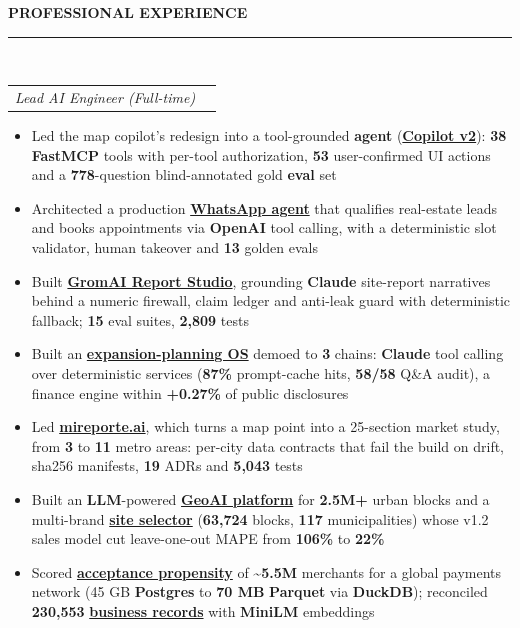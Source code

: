 \documentclass[10pt]{resume_gairo_peralta_openfont}
\makeatletter
\renewcommand{\section}[1]{%
  \vspace{3pt}%
  \raggedright{
    {\Large\bfseries\textcolor{sectioncolor}{\uppercase{#1}}}
  }\\[-0.6em]
  \rule{\textwidth}{0.5pt}\\[0.05em] %
}
\newenvironment{tightitemize}
{\begin{itemize}[leftmargin=1.2em,label={\textcolor{accentcolor}{$\bullet$}},itemsep=0.15em,partopsep=0pt,parsep=0pt,topsep=0pt]\raggedright}
{\end{itemize}}
\newcommand{\companytext}[1]{{\color{companycolor}\textbf{\textsc{#1}}}}
\newcommand{\roletext}[1]{{\color{rolecolor}\textit{#1}}}
\newcommand{\positionlocation}[3]{
  \begin{tabular*}{\textwidth}{@{}l@{\extracolsep{\fill}}r@{}}
    \roletext{#1} & \makebox[6.2cm][l]{#2 \hfill {\color{datecolor}\textbf{#3}}}
  \end{tabular*}
}
\newcommand{\highlight}[1]{{\textcolor{metriccolor}{\textbf{#1}}}}
\newcommand{\approxsym}{\textasciitilde}
\newcommand{\caselink}[2]{\href{https://gairoperalta.com/experience/#1/}{\textcolor{companycolor}{\textbf{#2}}}}
\makeatother
\begin{document}
\section{PROFESSIONAL EXPERIENCE}
\runsubsection{\companytext{BLACKPRINT TECHNOLOGIES}}
\positionlocation{Lead AI Engineer (Full-time)}{Remote}{2025--Present}
\begin{tightitemize}
\item Led the map copilot's redesign into a tool-grounded \textbf{agent} (\caselink{blackprint-copilot-v2}{Copilot v2}): \highlight{38} \textbf{FastMCP} tools with per-tool authorization, \highlight{53} user-confirmed UI actions and a \highlight{778}-question blind-annotated gold \textbf{eval} set
\item Architected a production \caselink{brokerai}{WhatsApp agent} that qualifies real-estate leads and books appointments via \textbf{OpenAI} tool calling, with a deterministic slot validator, human takeover and \highlight{13} golden evals
\item Built \caselink{gromai-report-studio}{GromAI Report Studio}, grounding \textbf{Claude} site-report narratives behind a numeric firewall, claim ledger and anti-leak guard with deterministic fallback; \highlight{15} eval suites, \highlight{2,809} tests
\item Built an \caselink{expansion-intelligence-os}{expansion-planning OS} demoed to \highlight{3} chains: \textbf{Claude} tool calling over deterministic services (\highlight{87\%} prompt-cache hits, \highlight{58/58} Q\&A audit), a finance engine within \highlight{+0.27\%} of public disclosures
\item Led \caselink{mireporte-ai}{mireporte.ai}, which turns a map point into a 25-section market study, from \highlight{3} to \highlight{11} metro areas: per-city data contracts that fail the build on drift, sha256 manifests, \highlight{19} ADRs and \highlight{5,043} tests
\item Built an \textbf{LLM}-powered \caselink{llm-geoai-platform-for-urban-intelligence}{GeoAI platform} for \highlight{2.5M+} urban blocks and a multi-brand \caselink{qsr-site-intelligence}{site selector} (\highlight{63,724} blocks, \highlight{117} municipalities) whose v1.2 sales model cut leave-one-out MAPE from \highlight{106\%} to \highlight{22\%}
\item Scored \caselink{acceptance-radar}{acceptance propensity} of \highlight{\approxsym5.5M} merchants for a global payments network (45 GB \textbf{Postgres} to \highlight{70 MB} \textbf{Parquet} via \textbf{DuckDB}); reconciled \highlight{230,553} \caselink{blackprint-radar}{business records} with \textbf{MiniLM} embeddings

\end{tightitemize}
\end{document}
